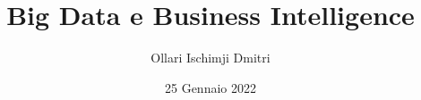 \documentclass{article}
\begin{document}
    \author{Ollari Ischimji Dmitri}
    \title{Big Data e Business Intelligence}
    \date{25 Gennaio 2022}

    \maketitle
    \tableofcontents

    \listoffigures
    \listoftables


    
    
    

    

    

    

    
    
    

    

    

    
\end{document}
